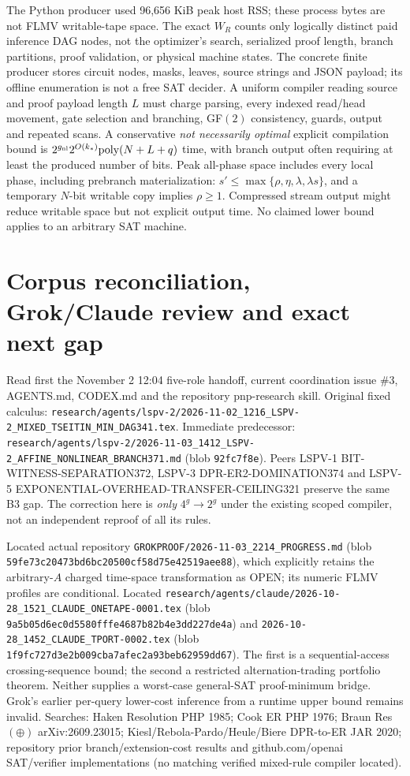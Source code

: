 \documentclass[11pt]{article}
\begin{document}
The Python producer used 96,656 KiB peak host RSS; these process bytes are not FLMV writable-tape space. The exact $W_R$ counts only logically distinct paid inference DAG nodes, not the optimizer's search, serialized proof length, branch partitions, proof validation, or physical machine states. The concrete finite producer stores circuit nodes, masks, leaves, source strings and JSON payload; its offline enumeration is not a free SAT decider. A uniform compiler reading source and proof payload length $L$ must charge parsing, every indexed read/head movement, gate selection and branching, GF$(2)$ consistency, guards, output and repeated scans. A conservative \emph{not necessarily optimal} explicit compilation bound is $2^{g_{\rm nl}}2^{O(k_*)}\mathrm{poly}(N+L+q)$ time, with branch output often requiring at least the produced number of bits. Peak all-phase space includes every local phase, including prebranch materialization: $s'\le\max\{\rho,\eta,\lambda,\lambda s\}$, and a temporary $N$-bit writable copy implies $\rho\ge1$. Compressed stream output might reduce writable space but not explicit output time. No claimed lower bound applies to an arbitrary SAT machine.

\section*{Corpus reconciliation, Grok/Claude review and exact next gap}
Read first the November 2 12:04 five-role handoff, current coordination issue \#3, AGENTS.md, CODEX.md and the repository pnp-research skill. Original fixed calculus: \texttt{research/agents/lspv-2/2026-11-02\_1216\_LSPV-2\_MIXED\_TSEITIN\_MIN\_DAG341.tex}. Immediate predecessor: \texttt{research/agents/lspv-2/2026-11-03\_1412\_LSPV-2\_AFFINE\_NONLINEAR\_BRANCH371.md} (blob \texttt{92fc7f8e}). Peers LSPV-1 BIT-WITNESS-SEPARATION372, LSPV-3 DPR-ER2-DOMINATION374 and LSPV-5 EXPONENTIAL-OVERHEAD-TRANSFER-CEILING321 preserve the same B3 gap. The correction here is \emph{only} $4^g\to 2^g$ under the existing scoped compiler, not an independent reproof of all its rules.

Located actual repository \texttt{GROKPROOF/2026-11-03\_2214\_PROGRESS.md} (blob \texttt{59fe73c20473bd6bc20500cf58d75e42519aee88}), which explicitly retains the arbitrary-$A$ charged time-space transformation as OPEN; its numeric FLMV profiles are conditional. Located \texttt{research/agents/claude/2026-10-28\_1521\_CLAUDE\_ONETAPE-0001.tex} (blob \texttt{9a5b05d6ec0d5580fffe4687b82b4e3dd227de4a}) and \texttt{2026-10-28\_1452\_CLAUDE\_TPORT-0002.tex} (blob \texttt{1f9fc727d3e2b009cba7afec2a93beb62959dd67}). The first is a sequential-access crossing-sequence bound; the second a restricted alternation-trading portfolio theorem. Neither supplies a worst-case general-SAT proof-minimum bridge. Grok's earlier per-query lower-cost inference from a runtime upper bound remains invalid. Searches: Haken Resolution PHP 1985; Cook ER PHP 1976; Braun Res$(\oplus)$ arXiv:2609.23015; Kiesl/Rebola-Pardo/Heule/Biere DPR-to-ER JAR 2020; repository prior branch/extension-cost results and github.com/openai SAT/verifier implementations (no matching verified mixed-rule compiler located).
\end{document}
